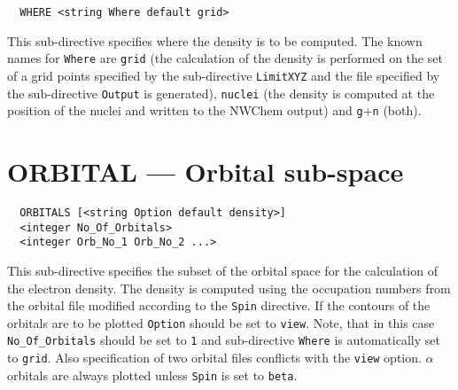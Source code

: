 \begin{verbatim}
  WHERE <string Where default grid>
\end{verbatim}

This sub-directive specifies where the density is to be computed.
The known names for \verb+Where+ are \verb+grid+ (the calculation of
the density is performed on the set of a grid points specified by the
sub-directive \verb+LimitXYZ+ and the file specified by the sub-directive
\verb+Output+ is generated), \verb+nuclei+ (the density is computed at
the position of the nuclei and written to the NWChem output) and
\verb+g++\verb+n+ (both).


\section{ORBITAL --- Orbital sub-space}

\begin{verbatim}
  ORBITALS [<string Option default density>]
  <integer No_Of_Orbitals>
  <integer Orb_No_1 Orb_No_2 ...>
\end{verbatim}

This sub-directive specifies the subset of the orbital space for the
calculation of the electron density. The density is computed using the
occupation numbers from the orbital file modified according to the
\verb+Spin+ directive. If the contours of the orbitals are to be plotted
\verb+Option+ should be set to \verb+view+. Note, that in this case
\verb+No_Of_Orbitals+ should be set to \verb+1+ and sub-directive
\verb+Where+ is automatically set to \verb+grid+. Also specification
of two orbital files conflicts with the \verb+view+ option.
$\alpha$ orbitals are always plotted unless \verb+Spin+ is set to
\verb+beta+.
